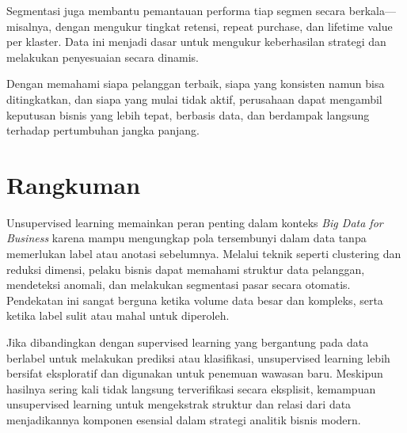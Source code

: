 Segmentasi juga membantu pemantauan performa tiap segmen secara berkala—misalnya, dengan mengukur tingkat retensi, repeat purchase, dan lifetime value per klaster. Data ini menjadi dasar untuk mengukur keberhasilan strategi dan melakukan penyesuaian secara dinamis.

Dengan memahami siapa pelanggan terbaik, siapa yang konsisten namun bisa ditingkatkan, dan siapa yang mulai tidak aktif, perusahaan dapat mengambil keputusan bisnis yang lebih tepat, berbasis data, dan berdampak langsung terhadap pertumbuhan jangka panjang.


%
%

\section{Rangkuman}

Unsupervised learning memainkan peran penting dalam konteks \textit{Big Data for Business} karena mampu mengungkap pola tersembunyi dalam data tanpa memerlukan label atau anotasi sebelumnya. Melalui teknik seperti clustering dan reduksi dimensi, pelaku bisnis dapat memahami struktur data pelanggan, mendeteksi anomali, dan melakukan segmentasi pasar secara otomatis. Pendekatan ini sangat berguna ketika volume data besar dan kompleks, serta ketika label sulit atau mahal untuk diperoleh.

Jika dibandingkan dengan supervised learning yang bergantung pada data berlabel untuk melakukan prediksi atau klasifikasi, unsupervised learning lebih bersifat eksploratif dan digunakan untuk penemuan wawasan baru. Meskipun hasilnya sering kali tidak langsung terverifikasi secara eksplisit, kemampuan unsupervised learning untuk mengekstrak struktur dan relasi dari data menjadikannya komponen esensial dalam strategi analitik bisnis modern.

